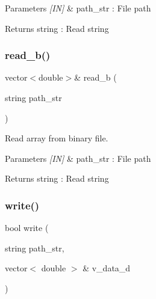 \begin{DoxyParams}{Parameters}
{\em \mbox{[}\+I\+N\mbox{]}} & path\+\_\+str \+: File path \\
\hline
\end{DoxyParams}
\begin{DoxyReturn}{Returns}
string \+: Read string 
\end{DoxyReturn}
\mbox{\label{classfile_a59d4760da225a342eab9465ccbd4226d}} 
\subsubsection{read\_b()}
{\footnotesize\ttfamily vector$<$double$>$\& read\+\_\+b (\begin{DoxyParamCaption}\item[{string}]{path\+\_\+str }\end{DoxyParamCaption})}



Read array from binary file. 


\begin{DoxyCode}{0}
\end{DoxyCode}



\begin{DoxyParams}{Parameters}
{\em \mbox{[}\+I\+N\mbox{]}} & path\+\_\+str \+: File path \\
\hline
\end{DoxyParams}
\begin{DoxyReturn}{Returns}
string \+: Read string 
\end{DoxyReturn}
\mbox{\label{classfile_afb167410f8b055155d582a7877028661}} 
\subsubsection{write()\hspace{0.1cm}{\footnotesize\ttfamily [1/2]}}
{\footnotesize\ttfamily bool write (\begin{DoxyParamCaption}\item[{string}]{path\+\_\+str,  }\item[{vector$<$ double $>$ \&}]{v\+\_\+data\+\_\+d }\end{DoxyParamCaption})}




